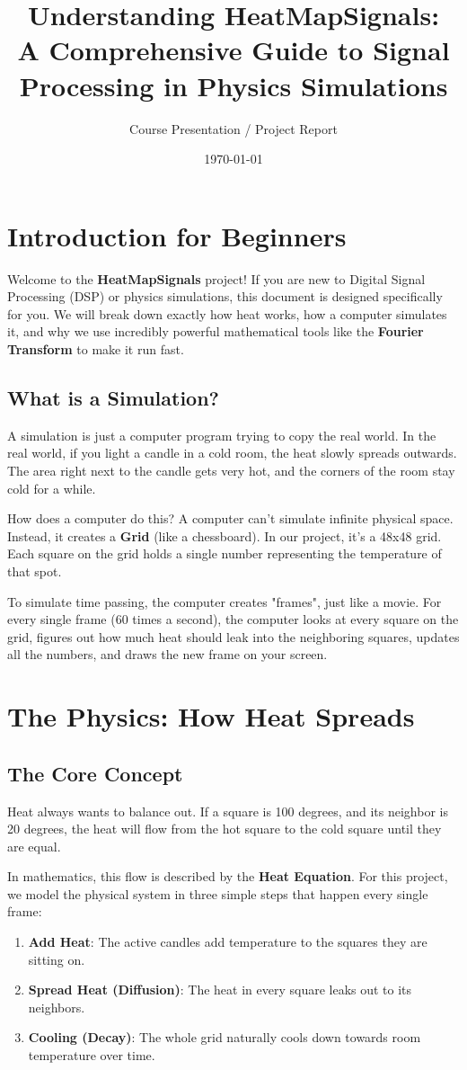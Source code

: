 \documentclass[11pt]{book}
\title{\textbf{Understanding HeatMapSignals:\\ A Comprehensive Guide to Signal Processing in Physics Simulations}}
\author{Course Presentation / Project Report}
\date{\today}
\begin{document}
\maketitle
\tableofcontents
\newpage

\chapter{Introduction for Beginners}
Welcome to the \textbf{HeatMapSignals} project! If you are new to Digital Signal Processing (DSP) or physics simulations, this document is designed specifically for you. We will break down exactly how heat works, how a computer simulates it, and why we use incredibly powerful mathematical tools like the \textbf{Fourier Transform} to make it run fast.

\section{What is a Simulation?}
A simulation is just a computer program trying to copy the real world. In the real world, if you light a candle in a cold room, the heat slowly spreads outwards. The area right next to the candle gets very hot, and the corners of the room stay cold for a while.

How does a computer do this? A computer can't simulate infinite physical space. Instead, it creates a \textbf{Grid} (like a chessboard). In our project, it's a 48x48 grid. Each square on the grid holds a single number representing the temperature of that spot. 

To simulate time passing, the computer creates "frames", just like a movie. For every single frame (60 times a second), the computer looks at every square on the grid, figures out how much heat should leak into the neighboring squares, updates all the numbers, and draws the new frame on your screen.

\chapter{The Physics: How Heat Spreads}
\section{The Core Concept}
Heat always wants to balance out. If a square is 100 degrees, and its neighbor is 20 degrees, the heat will flow from the hot square to the cold square until they are equal.

In mathematics, this flow is described by the \textbf{Heat Equation}. For this project, we model the physical system in three simple steps that happen every single frame:
\begin{enumerate}
    \item \textbf{Add Heat}: The active candles add temperature to the squares they are sitting on.
    \item \textbf{Spread Heat (Diffusion)}: The heat in every square leaks out to its neighbors.
    \item \textbf{Cooling (Decay)}: The whole grid naturally cools down towards room temperature over time.
\end{enumerate}
\end{document}
